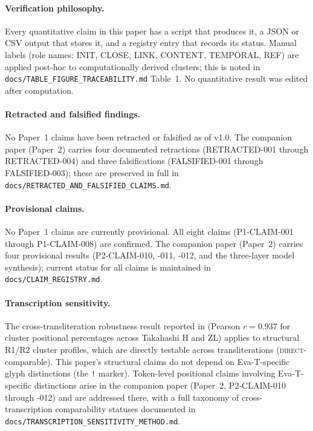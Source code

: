 \documentclass[11pt,a4paper,twocolumn]{article}
\begin{document}
\paragraph{Verification philosophy.}
Every quantitative claim in this paper has a script that produces it, a JSON or CSV output that stores it, and a registry entry that records its status. Manual labels (role names: INIT, CLOSE, LINK, CONTENT, TEMPORAL, REF) are applied post-hoc to computationally derived clusters; this is noted in \texttt{docs/TABLE\_FIGURE\_TRACEABILITY.md} Table~1. No quantitative result was edited after computation.

\paragraph{Retracted and falsified findings.}
No Paper~1 claims have been retracted or falsified as of v1.0. The companion paper (Paper~2) carries four documented retractions (RETRACTED-001 through RETRACTED-004) and three falsifications (FALSIFIED-001 through FALSIFIED-003); these are preserved in full in \texttt{docs/RETRACTED\_AND\_FALSIFIED\_CLAIMS.md}.

\paragraph{Provisional claims.}
No Paper~1 claims are currently provisional. All eight claims (P1-CLAIM-001 through P1-CLAIM-008) are confirmed. The companion paper (Paper~2) carries four provisional results (P2-CLAIM-010, -011, -012, and the three-layer model synthesis); current status for all claims is maintained in \texttt{docs/CLAIM\_REGISTRY.md}.

\paragraph{Transcription sensitivity.}
The cross-transliteration robustness result reported in  (Pearson $r = 0.937$ for cluster positional percentages across Takahashi H and ZL) applies to structural R1/R2 cluster profiles, which are directly testable across transliterations (\textsc{direct}-comparable). This paper's structural claims do not depend on Eva-T-specific glyph distinctions (the \texttt{!} marker). Token-level positional claims involving Eva-T-specific distinctions arise in the companion paper (Paper~2, P2-CLAIM-010 through -012) and are addressed there, with a full taxonomy of cross-transcription comparability statuses documented in \texttt{docs/TRANSCRIPTION\_SENSITIVITY\_METHOD.md}.
\end{document}
